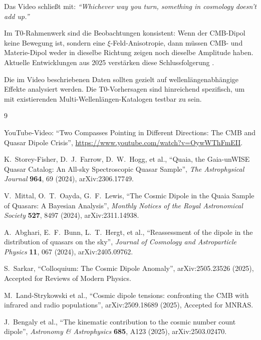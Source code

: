 	Das Video schließt mit: \textit{``Whichever way you turn, something in cosmology doesn't add up.''}

	Im T0-Rahmenwerk sind die Beobachtungen konsistent: Wenn der CMB-Dipol keine Bewegung ist, sondern eine $\xi$-Feld-Anisotropie, dann müssen CMB- und Materie-Dipol weder in dieselbe Richtung zeigen noch dieselbe Amplitude haben. Aktuelle Entwicklungen aus 2025 verstärken diese Schlussfolgerung \cite{sarkar2025}.

	Die im Video beschriebenen Daten sollten gezielt auf wellenlängenabhängige Effekte analysiert werden. Die T0-Vorhersagen sind hinreichend spezifisch, um mit existierenden Multi-Wellenlängen-Katalogen testbar zu sein.

	\begin{thebibliography}{9}
		
		YouTube-Video: ``Two Compasses Pointing in Different Directions: The CMB and Quasar Dipole Crisis'', 
		\url{https://www.youtube.com/watch?v=OywWThFmEII}.
		
		K.~Storey-Fisher, D.~J.~Farrow, D.~W.~Hogg, et al.,
		``Quaia, the Gaia-unWISE Quasar Catalog: An All-sky Spectroscopic Quasar Sample'',
		\emph{The Astrophysical Journal} \textbf{964}, 69 (2024),
		arXiv:2306.17749.
		
		V.~Mittal, O.~T.~Oayda, G.~F.~Lewis,
		``The Cosmic Dipole in the Quaia Sample of Quasars: A Bayesian Analysis'',
		\emph{Monthly Notices of the Royal Astronomical Society} \textbf{527}, 8497 (2024),
		arXiv:2311.14938.
		
		A.~Abghari, E.~F.~Bunn, L.~T.~Hergt, et al.,
		``Reassessment of the dipole in the distribution of quasars on the sky'',
		\emph{Journal of Cosmology and Astroparticle Physics} \textbf{11}, 067 (2024),
		arXiv:2405.09762.
		
		S.~Sarkar,
		``Colloquium: The Cosmic Dipole Anomaly'',
		arXiv:2505.23526 (2025),
		Accepted for Reviews of Modern Physics.
		
		M.~Land-Strykowski et al.,
		``Cosmic dipole tensions: confronting the CMB with infrared and radio populations'',
		arXiv:2509.18689 (2025),
		Accepted for MNRAS.
		
		J.~Bengaly et al.,
		``The kinematic contribution to the cosmic number count dipole'',
		\emph{Astronomy \& Astrophysics} \textbf{685}, A123 (2025),
		arXiv:2503.02470.
		
	\end{thebibliography}
